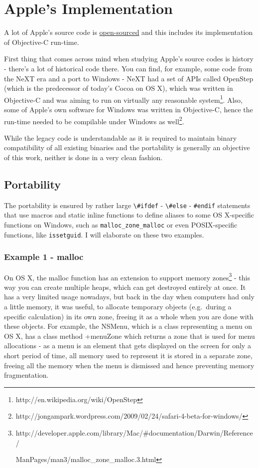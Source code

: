 \chapter{Apple's Implementation}

A lot of Apple's source code is \href{''http://www.opensource.apple.com''}{open-sourced} and this includes its implementation of Objective-C run-time.

First thing that comes across mind when studying Apple's source codes is history - there's a lot of historical code there. You can find, for example, some code from the NeXT era and a port to Windows - NeXT had a set of APIs called OpenStep (which is the predecessor of today's Cocoa on OS X), which was written in Objective-C and was aiming to run on virtually any reasonable system\footnote{http://en.wikipedia.org/wiki/OpenStep}. Also, some of Apple's own software for Windows was written in Objective-C, hence the run-time needed to be compilable under Windows as well\footnote{http://jongampark.wordpress.com/2009/02/24/safari-4-beta-for-windows/}.

While the legacy code is understandable as it is required to maintain binary compatibility of all existing binaries and the portability is generally an objective of this work, neither is done in a very clean fashion.

\section{Portability}
The portability is ensured by rather large \verb=\#ifdef= - \verb=\#else= - \verb=#endif= statements that use macros and static inline functions to define aliases to some OS X-specific functions on Windows, such as \verb=malloc_zone_malloc= or even POSIX-specific functions, like \verb=issetguid=. I will elaborate on these two examples.

\subsection{Example 1 - malloc}
On OS X, the malloc function has an extension to support memory zones\footnote{http://developer.apple.com/library/Mac/\#documentation/Darwin/Reference/

ManPages/man3/malloc\_zone\_malloc.3.html} - this way you can create multiple heaps, which can get destroyed entirely at once. It has a very limited usage nowadays, but back in the day when computers had only a little memory, it was useful, to allocate temporary objects (e.g.\ during a specific calculation) in its own zone, freeing it as a whole when you are done with these objects. For example, the NSMenu, which is a class representing a menu on OS X, has a class method +menuZone which returns a zone that is used for menu allocations - as a menu is an element that gets displayed on the screen for only a short period of time, all memory used to represent it is stored in a separate zone, freeing all the memory when the menu is dismissed and hence preventing memory fragmentation.

